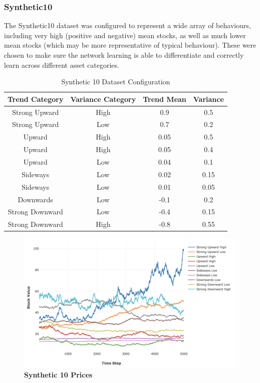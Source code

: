 \documentclass[a4paper,11pt,oneside]{article}
\theoremstyle{plain}
\theoremstyle{definition}
\begin{document}
	\subsubsection{Synthetic10}\label{dataset_synthetic10}
	
	The Synthetic10 dataset was configured to represent a wide array of behaviours, including very high (positive and negative) mean stocks, as well as much lower mean stocks (which may be more representative of typical behaviour). These were chosen to make sure the network learning is able to differentiate and correctly learn across different asset categories.
	
	\begin{table}[H]
		\centering
		\begin{tabular}{|c|c|c|c|}
			\hline
			\textbf{Trend Category} &\textbf{Variance Category} & \textbf{Trend Mean} & \textbf{Variance}\\\hline	
			{Strong Upward} 		& {High} & {0.9} & {0.5} \\\hline
			{Strong Upward} 		& {Low} & {0.7} & {0.2} \\\hline
			{Upward} 					& {High} & {0.05} & {0.5} \\\hline
			{Upward} 					& {High} & {0.05} & {0.4} \\\hline
			{Upward} 					& {Low} & {0.04} & {0.1} \\\hline
			{Sideways} 					& {Low} & {0.02} & {0.15} \\\hline
			{Sideways}					& {Low} & {0.01} & {0.05} \\\hline
			{Downwards}				& {Low} & {-0.1} & {0.2} \\\hline
			{Strong Downward} 	& {Low} & {-0.4} & {0.15} \\\hline
			{Strong Downward}	& {High} & {-0.8} & {0.55} \\\hline
		\end{tabular}
		\newline\newline
		\caption{Synthetic 10 Dataset Configuration}\label{tab_synth10}
	\end{table}
	
	\begin{figure}[H]
		\centering
		\includegraphics[scale=0.35]{images/results/prices/synthetic10_prices.png} 
		\caption[Synthetic 10 Prices]{\textbf{Synthetic 10 Prices}}
		\label{figure-synthetic10_prices}
	\end{figure}
	
\end{document}
